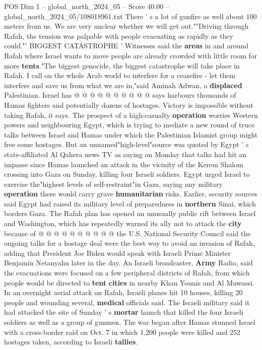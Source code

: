 \begin{textsample}{POS Dim 1 – global\_north\_2024\_05 – Score 40.00 – global\_north\_2024\_05/108018961.txt}
There ' s a lot of gunfire as well about 100 meters from us.
We are very unclear whether we will get out.""Driving through Rafah, the tension was palpable with people evacuating as rapidly as they could."' BIGGEST CATASTROPHE ' Witnesses said the \textbf{areas} in and around Rafah where Israel wants to move people are already crowded with little room for more \textbf{tents}."The biggest genocide, the biggest catastrophe will take place in Rafah.
I call on the whole Arab world to interfere for a ceasefire - let them interfere and save us from what we are in,"said Aminah Adwan, a \textbf{displaced} Palestinian.
Israel has @ @ @ @ @ @ @ @ @ @ says harbours thousands of Hamas fighters and potentially dozens of hostages.
Victory is impossible without taking Rafah, it says.
The prospect of a high-casualty \textbf{operation} worries Western powers and neighbouring Egypt, which is trying to mediate a new round of truce talks between Israel and Hamas under which the Palestinian Islamist group might free some hostages.
But an unnamed"high-level"source was quoted by Egypt ' s state-affiliated Al Qahera news TV as saying on Monday that talks had hit an impasse since Hamas launched an attack in the vicinity of the Kerem Shalom crossing into Gaza on Sunday, killing four Israeli soldiers.
Egypt urged Israel to exercise the"highest levels of self-restraint"in Gaza, saying any military \textbf{operation} there would carry grave \textbf{humanitarian} risks.
Earlier, security sources said Egypt had raised its military level of preparedness in \textbf{northern} Sinai, which borders Gaza.
The Rafah plan has opened an unusually public rift between Israel and Washington, which has repeatedly warned its ally not to attack the \textbf{city} because of @ @ @ @ @ @ @ @ @ @ the U.S.
National Security Council said the ongoing talks for a hostage deal were the best way to avoid an invasion of Rafah, adding that President Joe Biden would speak with Israeli Prime Minister Benjamin Netanyahu later in the day.
An Israeli broadcaster, \textbf{Army} Radio, said the evacuations were focused on a few peripheral districts of Rafah, from which people would be directed to \textbf{tent} \textbf{cities} in nearby Khan Younis and Al Muwassi.
In an overnight aerial attack on Rafah, Israeli planes hit 10 houses, killing 20 people and wounding several, \textbf{medical} officials said.
The Israeli military said it had attacked the site of Sunday ' s \textbf{mortar} launch that killed the four Israeli soldiers as well as a group of gunmen.
The war began after Hamas stunned Israel with a cross-border raid on Oct. 7 in which 1,200 people were killed and 252 hostages taken, according to Israeli \textbf{tallies}.

\end{textsample}
